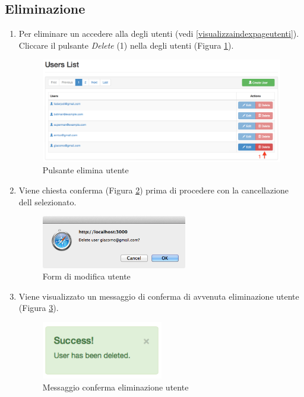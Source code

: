 	\subsection{Eliminazione} %
	\label{utenti-eliminazione}
		\begin{enumerate}

				\item Per eliminare un  accedere alla  degli utenti (vedi \ref{visualizzaindexpageutenti}). Cliccare il pulsante \emph{Delete} (1) nella  degli utenti (Figura \ref{fig:deleteUserButton}).
					\begin{figure}[H]
						\centering \includegraphics[width=1\textwidth]{img/deleteUserButton.png}
						\caption{ \label{fig:deleteUserButton} Pulsante elimina utente}
					\end{figure}

				\item Viene chiesta conferma (Figura \ref{fig:confirmDeleteUser}) prima di procedere con la cancellazione dell  selezionato.

					\begin{figure}[H]
						\centering \includegraphics[width=0.6\textwidth]{img/confirmDeleteUser.png}
						\caption{ \label{fig:confirmDeleteUser} Form di modifica utente}
					\end{figure}

				\item Viene visualizzato un messaggio di conferma di avvenuta eliminazione utente (Figura \ref{fig:messageDeletedUser}).

					\begin{figure}[H]
						\centering \includegraphics[width=0.5\textwidth]{img/messageDeletedUser.png}
						\caption{ \label{fig:messageDeletedUser} Messaggio conferma eliminazione utente}
					\end{figure}

			\end{enumerate}  
		